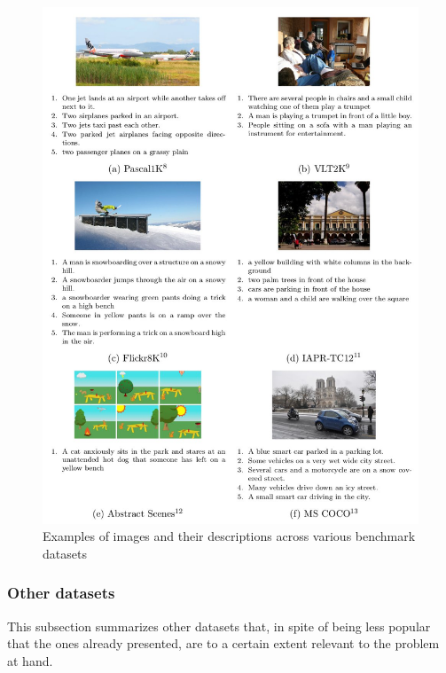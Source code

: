 \begin{figure}[hpt]
	\centering
	\includegraphics[scale=0.45]{images/ch2/image-caption-examples.jpg}
	\caption{Examples of images and their descriptions across various benchmark datasets}
	\label{fig:samples}
\end{figure}

\subsubsection{Other datasets}

This subsection summarizes other datasets that, in spite of being less popular that the ones already presented,  are to a certain extent relevant to the problem at hand.

